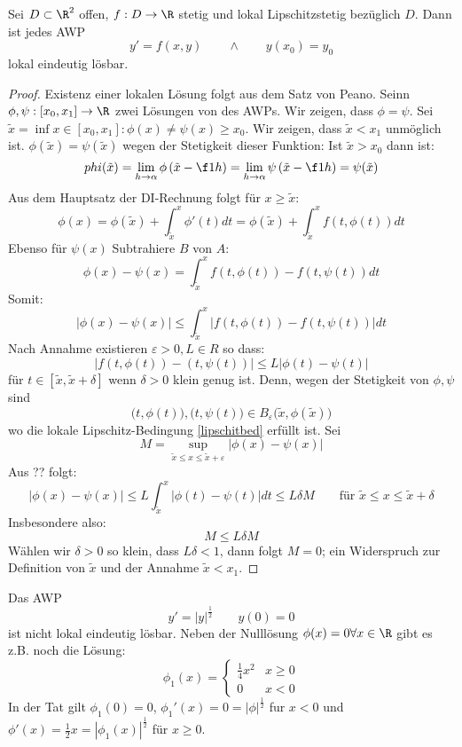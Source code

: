 \documentclass[a4paper,10pt]{scrbook}
\begin{document}
\begin{thm}
Sei $ D \subset \R^2$ offen, $f:D\to \R$ stetig und lokal Lipschitzstetig bezüglich $D$. Dann ist jedes
AWP
\[
y'=f(x,y) \qquad\land\qquad y(x_0)=y_0
\]
lokal eindeutig lösbar. 
\begin{proof}
Existenz einer lokalen Lösung folgt aus dem Satz von Peano.
Seinn $\phi, \psi: [x_0,x_1] \to \R$ zwei Lösungen von des AWPs. Wir zeigen, dass $\phi=\psi$.
Sei $\tilde x = \inf{x\in [x_0,x_1]: \phi(x)\ne\psi(x)} \ge x_0$.
Wir zeigen, dass $\tilde x<x_1$ unmöglich ist. $\phi(\tilde x) = \psi(\tilde x)$ wegen der Stetigkeit dieser
Funktion:
Ist $\tilde x > x_0$
dann ist:
\[
phi(\tilde x)= \lim_{h\to\alpha}\phi\left(\tilde x - \f 1h\right)=\lim_{h\to\alpha}\psi\left(\tilde x - \f 1h\right) = \psi(\tilde x)
\]
Aus dem Hauptsatz der DI-Rechnung folgt für $x\ge\tilde x$:
\[
\phi(x)= \phi(\tilde x)+\int_{\tilde x}^x\phi'(t)dt
=\phi(\tilde x) + \int_{\tilde x}^xf(t,\phi(t))dt
\]
Ebenso für $\psi(x)$
Subtrahiere $B$ von $A$:
\[
\phi(x)-\psi(x)=\int_{\tilde x}^xf(t,\phi(t))-f(t,\psi(t))dt
\]
Somit:
\[
|\phi(x)-\psi(x)| \le \int_{\tilde x}^x|f(t,\phi(t)) - f(t,\psi(t))|dt
\]
Nach Annahme existieren $\varepsilon > 0, L\in R$ so dass:
\[
\label{libschitzbed}
|f(t,\phi(t)) -(t,\psi(t))| \le L|\phi(t)-\psi(t)|
\]
für $t\in[\tilde x, \tilde x +\delta]$ wenn $\delta >0$ klein genug ist. Denn, wegen der Stetigkeit von $\phi,\psi$ sind
\[
	\big(t,\phi(t)\big),\big(t,\psi(t)\big)\in B_\varepsilon\big(\tilde x, \phi(\tilde x)\big)
\]
wo die lokale Lipschitz-Bedingung \eqref{lipschitbed} erfüllt ist.
Sei 
\[
M=\sup_{\tilde x \le x \le \tilde x + \varepsilon}|\phi(x)-\psi(x)|
\]
Aus ?? folgt:
\[
|\phi(x)-\psi(x)|\le L\int_{\tilde x}^x|\phi(t)-\psi(t)|dt \le L\delta M \qquad \text{für } \tilde x \le x \le \tilde x+\delta
\]
Insbesondere also: 
\[
M\le L\delta M
\]
Wählen wir $\delta >0$ so klein, dass $L\delta <1$, dann folgt $M=0$;
ein Widerspruch zur Definition von $\tilde x$ und der Annahme $\tilde x<x_1$.
\end{proof}
\end{thm}

\begin{ex*}
Das AWP
\[
y'=|y|^{\frac 12} \qquad y(0)=0
\]
ist nicht lokal eindeutig lösbar. Neben der Nulllösung $\phi(x)=0 \forall x\in\R$ gibt es z.B. noch die Lösung:
\[
\phi_1(x)=
\begin{cases}
\frac 14 x^2 &x\ge 0\\
0 &x<0
\end{cases}
\]
In der Tat gilt $\phi_1(0)=0$, $\phi_1'(x)=0=|\phi|^{\frac 12}$ fur $x<0$ und $\phi'(x)=\frac 12 x = |\phi_1(x)|^{\frac 12}$ für $x\ge0$.
\end{ex*}
\end{document}
